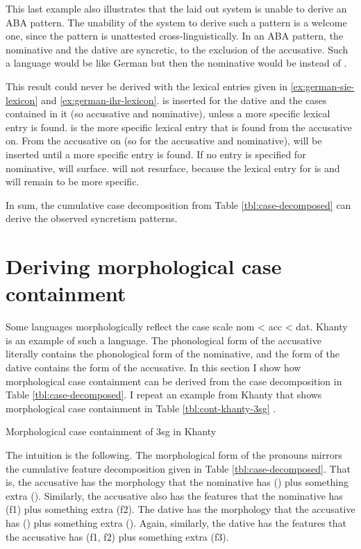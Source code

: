 This last example also illustrates that the laid out system is unable to derive an ABA pattern. The unability of the system to derive such a pattern is a welcome one, since the pattern is unattested cross-linguistically. In an ABA pattern, the nominative and the dative are syncretic, to the exclusion of the accusative. Such a language would be like German but then the nominative would be  instead of .

This result could never be derived with the lexical entries given in \ref{ex:german-sie-lexicon} and \ref{ex:german-ihr-lexicon}.  is inserted for the dative and the cases contained in it (so accusative and nominative), unless a more specific lexical entry is found.  is the more specific lexical entry that is found from the accusative on. From the accusative on (so for the accusative and nominative),  will be inserted until a more specific entry is found. If no entry is specified for nominative,  will surface.  will not resurface, because the lexical entry for  is and will remain to be more specific.

In sum, the cumulative case decomposition from Table \ref{tbl:case-decomposed} can derive the observed syncretism patterns.

\section{Deriving morphological case containment}

Some languages morphologically reflect the case scale \ac{nom} < \ac{acc} < \ac{dat}. Khanty is an example of such a language. The phonological form of the accusative literally contains the phonological form of the nominative, and the form of the dative contains the form of the accusative. In this section I show how morphological case containment can be derived from the case decomposition in Table \ref{tbl:case-decomposed}. I repeat an example from Khanty that shows morphological case containment in Table \ref{tbl:cont-khanty-3sg} .

\begin{table}[ht]
  \center
  \caption {Morphological case containment of 3\ac{sg} in Khanty}
    
  \label{tbl:cont-khanty-3sg}
\end{table}

The intuition is the following. The morphological form of the pronouns mirrors the cumulative feature decomposition given in Table \ref{tbl:case-decomposed}. That is, the accusative has the morphology that the nominative has () plus something extra (). Similarly, the accusative also has the features that the nominative has (\ac{f}1) plus something extra (\ac{f}2). The dative has the morphology that the accusative has () plus something extra (). Again, similarly, the dative has the features that the accusative has (\ac{f}1, \ac{f}2) plus something extra (\ac{f}3).

